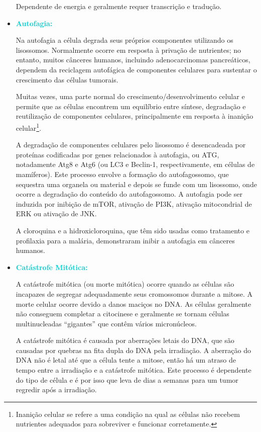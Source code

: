 \documentclass[11pt,a4paper]{article}
\begin{document}
\begin{itemize}[label=\textcolor{CarnationPink}{$\blacktriangleright$}]
		Dependente de energia e geralmente requer transcrição e tradução. 

		\item \textcolor{DarkTurquoise}{\LobsterTwo\Large\textbf{Autofagia:}}
		
		Na autofagia a célula degrada seus próprios componentes utilizando os lisossomos. Normalmente ocorre em resposta à privação de nutrientes; no entanto, muitos cânceres humanos, incluindo adenocarcinomas pancreáticos, dependem da reciclagem autofágica de componentes celulares para sustentar o crescimento das células tumorais.

		Muitas vezes, uma parte normal do crescimento/desenvolvimento celular e permite que as células encontrem um equilíbrio entre síntese, degradação e reutilização de componentes celulares, principalmente em resposta à inanição celular\footnote{Inanição celular se refere a uma condição na qual as células não recebem nutrientes adequados para sobreviver e funcionar corretamente.}.

		A degradação de componentes celulares pelo lisossomo é desencadeada por proteínas codificadas por genes relacionados à autofagia, ou ATG, notadamente Atg8 e Atg6 (ou LC3 e Beclin-1, respectivamente, em células de mamíferos). Este processo envolve a formação do autofagossomo, que sequestra uma organela ou material e depois se funde com um lisossomo, onde ocorre a degradação do conteúdo do autofagossomo. A autofagia pode ser induzida por inibição de mTOR, ativação de PI3K, ativação mitocondrial de ERK ou ativação de JNK.

		A cloroquina e a hidroxicloroquina, que têm sido usadas como tratamento e profilaxia para a malária, demonstraram inibir a autofagia em cânceres humanos.

		\item \textcolor{DarkTurquoise}{\LobsterTwo\Large\textbf{Catástrofe Mitótica:}}
		
		A catástrofe mitótica (ou morte mitótica) ocorre quando as células são incapazes de segregar adequadamente seus cromossomos durante a mitose. A morte celular ocorre devido a danos maciços no DNA. As células geralmente não conseguem completar a citocinese e geralmente se tornam células multinucleadas “gigantes” que contêm vários micronúcleos.

		A catástrofe mitótica é causada por aberrações letais do DNA, que são causadas por quebras na fita dupla do DNA pela irradiação. A aberração do DNA não é letal até que a célula tente a mitose, então há um atraso de tempo entre a irradiação e a catástrofe mitótica. Este processo é dependente do tipo de célula e é por isso que leva de dias a semanas para um tumor regredir após a irradiação.
		

\end{itemize}
\end{document}

